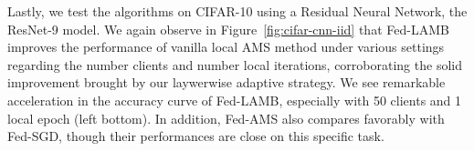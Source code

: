 \documentclass{article}
\begin{document}



Lastly, we test the algorithms on CIFAR-10 using a Residual Neural Network, the ResNet-9 model. 
We again observe in Figure~\ref{fig:cifar-cnn-iid} that Fed-LAMB improves the performance of vanilla local AMS method under various settings regarding the number clients and number local iterations, corroborating the solid improvement brought by our laywerwise adaptive strategy. We see remarkable acceleration in the accuracy curve of Fed-LAMB, especially with 50 clients and 1 local epoch (left bottom). In addition, Fed-AMS also compares favorably with Fed-SGD, though their performances are close on this specific task. 

\end{document}
